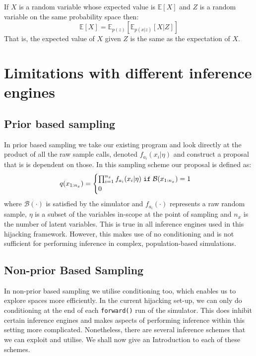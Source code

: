 \documentclass{article}
\begin{document}
If $X$ is a random variable whose expected value is $\mathbb{E}[X]$ and $Z$ is a random variable on the same probability space
then: \begin{equation}
  \label{eq:lawoftotalexp}
  \mathbb{E}[X] = \mathbb{E}_{p(z)}[\mathbb{E}_{p(x|z)}[X | Z]]
\end{equation}
That is, the expected value of $X$ given $Z$ is the same as the expectation of $X$.

\section{Limitations with different inference engines}  


\subsection{Prior based sampling}
In prior based sampling we take our existing program and look directly at the product of all the raw sample calls, denoted $f_{a_i}(x_i | \eta)$ and 
construct a proposal that is is dependent on those. In this sampling scheme our proposal is defined as:
\begin{equation}
  q(x_{1:n_{x}}) = 
  \begin{cases}
    \prod_{i=1}^{n_x} f_{a_i}(x_i | \eta) \hspace{0.1cm} \texttt{if} \hspace{0.1cm} \mathcal{B}(x_{1:n_{x}})=1 \\
    0
  \end{cases}
\end{equation}
where $\mathcal{B}(\cdot)$ is satisfied by the simulator and $f_{a_i}(\cdot)$ represents a
raw random sample, $\eta$ is a subset of the variables in-scope at the point of sampling
and $n_{x}$ is the number of latent variables.
 This is true in all inference engines used in this hijacking framework.
However, this makes use of no conditioning and is not sufficient for performing inference in
complex, population-based simulations.

\subsection{Non-prior Based Sampling}
In non-prior based sampling we utilise conditioning too, which enables 
us to explore spaces more efficiently. 
In the current hijacking set-up, we
can only do conditioning at the end of each \texttt{forward()} run of the simulator. 
This does inhibit certain inference engines and makes aspects of performing inference 
within this setting more complicated. 
Nonetheless, there are several inference schemes 
that we can exploit and utilise. 
We shall now give an Introduction to each of these schemes. 
\end{document}
